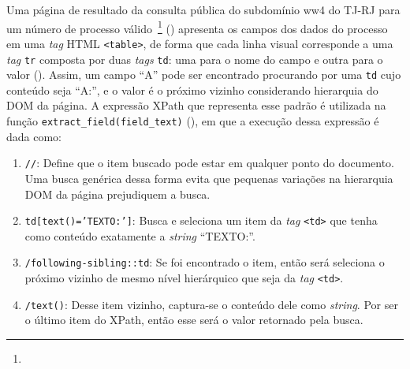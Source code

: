 Uma página de resultado da consulta pública do subdomínio ww4 do TJ-RJ para um
número de processo válido~\footnote{\urlProcValido}
() apresenta os campos dos dados do processo em
uma \textit{tag} HTML \texttt{<table>}, de forma que cada linha visual
corresponde a uma \textit{tag} \texttt{tr} composta por duas \textit{tags}
\texttt{td}: uma para o nome do campo e outra para o valor
(). Assim, um campo ``A'' pode ser encontrado procurando
por uma \texttt{td} cujo conteúdo seja ``A:'', e o valor é o próximo vizinho
considerando hierarquia do DOM da página. A expressão XPath que representa esse
padrão é utilizada na função \texttt{extract_field(field_text)}
(), em que a execução dessa expressão é dada como:

\begin{enumerate}
    \item \texttt{//}: Define que o item buscado pode estar em qualquer ponto
        do documento. Uma busca genérica dessa forma evita que pequenas
        variações na hierarquia DOM da página prejudiquem a busca.
    \item \texttt{td[text()='TEXTO:']}: Busca e seleciona um item da
        \textit{tag} \texttt{<td>} que tenha como conteúdo exatamente a
        \textit{string} ``TEXTO:''.
    \item \texttt{/following-sibling::td}: Se foi encontrado o item, então
        será seleciona o próximo vizinho de mesmo nível hierárquico que seja da
        \textit{tag} \texttt{<td>}.
    \item \texttt{/text()}: Desse item vizinho, captura-se o conteúdo dele
        como \textit{string}. Por ser o último item do XPath, então esse será o
        valor retornado pela busca.
\end{enumerate}


